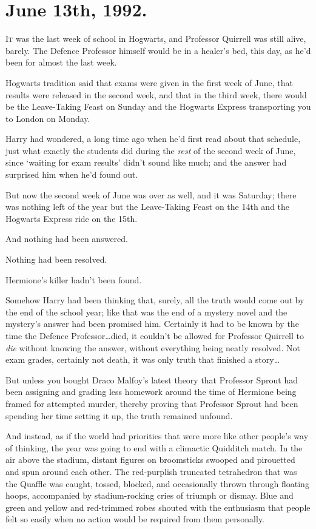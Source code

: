
\section{June 13th, 1992.}

\lettrine{I}{t} was the last week of school in Hogwarts, and Professor Quirrell was still
alive, barely. The Defence Professor himself would be in a healer's bed, this
day, as he'd been for almost the last week.

Hogwarts tradition said that exams were given in the first week of June, that
results were released in the second week, and that in the third week, there
would be the Leave-Taking Feast on Sunday and the Hogwarts Express transporting
you to London on Monday.

Harry had wondered, a long time ago when he'd first read about that schedule,
just what exactly the students did during the \emph{rest} of the second week of
June, since `waiting for exam results' didn't sound like much; and the answer
had surprised him when he'd found out.

But now the second week of June was over as well, and it was Saturday; there
was nothing left of the year but the Leave-Taking Feast on the 14th and the
Hogwarts Express ride on the 15th.

And nothing had been answered.

Nothing had been resolved.

Hermione's killer hadn't been found.

Somehow Harry had been thinking that, surely, all the truth would come out by
the end of the school year; like that was the end of a mystery novel and the
mystery's answer had been promised him. Certainly it had to be known by the
time the Defence Professor…died, it couldn't be allowed for Professor
Quirrell to \emph{die} without knowing the answer, without everything being
neatly resolved. Not exam grades, certainly not death, it was only truth that
finished a story…

But unless you bought Draco Malfoy's latest theory that Professor Sprout had
been assigning and grading less homework around the time of Hermione being
framed for attempted murder, thereby proving that Professor Sprout had been
spending her time setting it up, the truth remained unfound.

And instead, as if the world had priorities that were more like other people's
way of thinking, the year was going to end with a climactic Quidditch match.
\later
In the air above the stadium, distant figures on broomsticks swooped and
pirouetted and spun around each other. The red-purplish truncated tetrahedron
that was the Quaffle was caught, tossed, blocked, and occasionally thrown
through floating hoops, accompanied by stadium-rocking cries of triumph or
dismay. Blue and green and yellow and red-trimmed robes shouted with the
enthusiasm that people felt so easily when no action would be required from
them personally.


